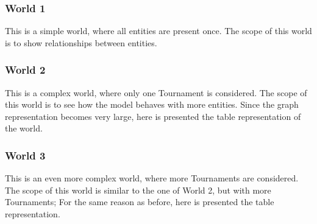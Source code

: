 \subsubsection{World 1} 
This is a simple world, where all entities are present once. The scope of this world is to show relationships between entities.
\clearpage
\subsubsection{World 2}
This is a complex world, where only one Tournament is considered. The scope of this world is to see how the model behaves with more entities. 
Since the graph representation becomes very large, here is presented the table representation of the world.

\clearpage
\subsubsection{World 3}
This is an even more complex world, where more Tournaments are considered. The scope of this world is similar to the one of World 2, but with more Tournaments;
For the same reason as before, here is presented the table representation.

